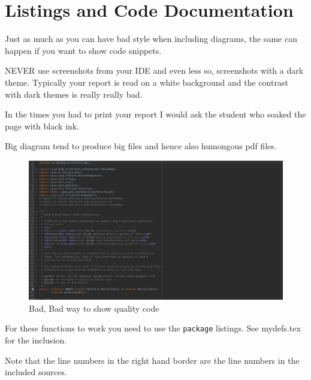 \def\TheFile{ch05_codelisting.tex}
\chapter{Listings and Code Documentation}
\label{chap:listings}
Just as much as you can have bad style when including diagrams, the same can happen if
you want to show code snippets.

\begin{Itemize}
\item {\color{red!60!black}\Huge{}NEVER} use screenshots from your IDE and even less so, screenshots with a dark theme.
  Typically your report is read on a white background and the contrast with dark themes is really really bad.
\item In the times you had to print your report I would ask the student who soaked the page with black ink.
\item Big diagram tend to produce big files and hence also humongous pdf files.
\end{Itemize}

\begin{figure}
  \caption{Bad, Bad way to show quality code}
  \includegraphics[width=\textwidth]{images/dao.png}
\end{figure}

For these functions to work you need to use the \texttt{package} listings.
See mydefs.tex for the inclusion.


Note that the line numbers in the right hand border are the line
numbers in the included sources.


